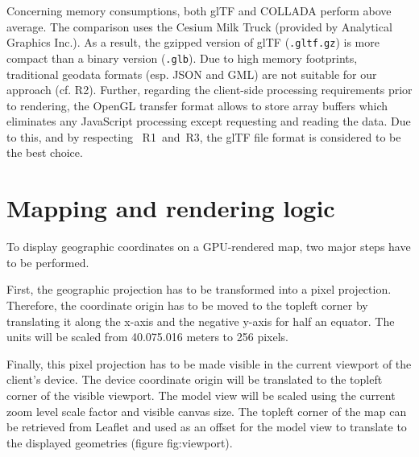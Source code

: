      Concerning memory consumptions, both glTF and COLLADA perform above average. The
      comparison uses the Cesium Milk Truck (provided by Analytical Graphics Inc.). As
      a result, the gzipped version of glTF (\texttt{.gltf.gz}) is more compact than a
      binary version (\texttt{.glb}). Due to high memory footprints, traditional
      geodata formats (esp. JSON and GML) are not suitable for our approach (cf. R2). Further,
      regarding the client-side processing requirements prior to rendering, the OpenGL
      transfer format allows to store array buffers which eliminates any JavaScript
      processing except requesting and reading the data. Due to this, and by respecting~
      R1~and~R3, the glTF file format is considered to be the best choice.

  \section{Mapping and rendering logic}
    To display geographic coordinates on a GPU-rendered map, two major steps have to be performed.\par
    First, the geographic projection has to be transformed into a pixel projection. Therefore, the coordinate origin has to be moved to the topleft corner by translating it along the x-axis and the negative y-axis for half an equator. The units will be scaled from 40.075.016 meters to 256 pixels.


    Finally, this pixel projection has to be made visible in the current viewport of the client's device. The device coordinate origin will be translated to the topleft corner of the visible viewport. The model view will be scaled using the current zoom level scale factor and visible canvas size.  The topleft corner of the map can be retrieved from Leaflet and used as an offset for the model view to translate to the displayed geometries (figure {fig:viewport}).\par
